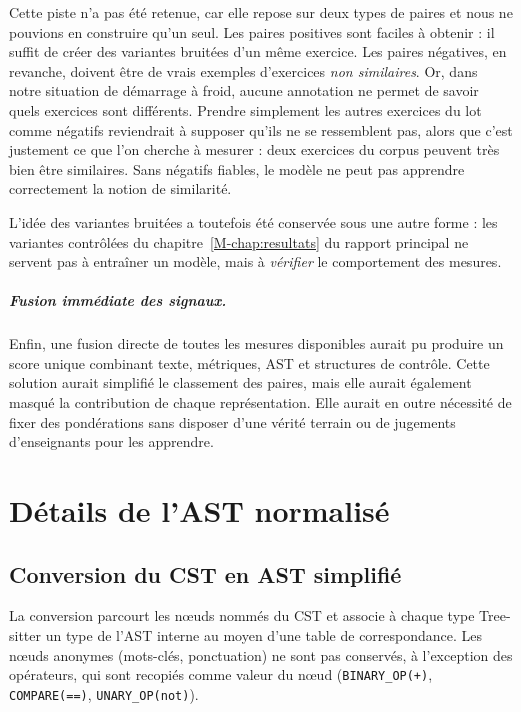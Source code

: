 \documentclass[12pt,a4paper,oneside]{report}
\begin{document}
Cette piste n'a pas été retenue, car elle repose sur deux types de paires
et nous ne pouvions en construire qu'un seul. Les paires positives sont faciles
à obtenir : il suffit de créer des variantes bruitées d'un même exercice.
Les paires négatives, en revanche, doivent être de vrais exemples
d'exercices \emph{non similaires}. Or, dans notre situation de démarrage à
froid, aucune annotation ne permet de savoir quels exercices sont différents.
Prendre simplement les autres exercices du lot comme négatifs reviendrait à
supposer qu'ils ne se ressemblent pas, alors que c'est justement ce que l'on
cherche à mesurer : deux exercices du corpus peuvent très bien être
similaires. Sans négatifs fiables, le modèle ne peut pas apprendre
correctement la notion de similarité.

L'idée des variantes bruitées a toutefois été conservée sous une autre
forme : les variantes contrôlées du chapitre~\ref{M-chap:resultats} du rapport principal ne servent
pas à entraîner un modèle, mais à \emph{vérifier} le comportement des mesures.

\paragraph{Fusion immédiate des signaux.}

Enfin, une fusion directe de toutes les mesures disponibles aurait pu produire
un score unique combinant texte, métriques, AST et structures de contrôle.
Cette solution aurait simplifié le classement des paires, mais elle aurait
également masqué la contribution de chaque représentation. Elle aurait en
outre nécessité de fixer des pondérations sans disposer d'une vérité terrain
ou de jugements d'enseignants pour les apprendre.


\chapter{Détails de l'AST normalisé}
\label{chap:ast}

\section{Conversion du CST en AST simplifié}
\label{sec:conversion_ast}


La conversion parcourt les nœuds nommés du CST et associe à chaque type
Tree-sitter un type de l'AST interne au moyen d'une table de correspondance.
Les nœuds anonymes (mots-clés, ponctuation) ne sont pas conservés, à
l'exception des opérateurs, qui sont recopiés comme valeur du nœud
(\texttt{BINARY\_OP(+)}, \texttt{COMPARE(==)}, \texttt{UNARY\_OP(not)}).
\end{document}
